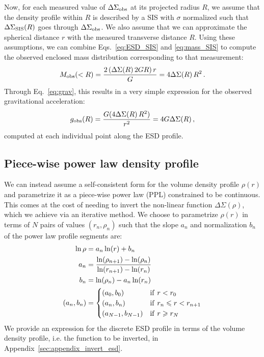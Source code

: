 \documentclass[usenatbib]{mnras}
\newcommand{\un}[1]{_{\rm #1}}
\begin{document}
Now, for each measured value of $\Delta\Sigma\un{obs}$ at its projected radius $R$, we assume that the density profile within $R$ is described by a SIS with $\sigma$ normalized such that $\Delta\Sigma\un{SIS}(R)$ goes through $\Delta\Sigma\un{obs}$. We also assume that we can approximate the spherical distance $r$ with the measured transverse distance $R$. Using these assumptions, we can combine Eqs.~\ref{eq:ESD_SIS} and \ref{eq:mass_SIS} to compute the observed enclosed mass distribution corresponding to that measurement:
\begin{equation}\label{eq:Mobs}
	M\un{obs}(<R) = \frac{2 \, (\Delta\Sigma(R) \, 2 G R) \, r}{G} = 4 \Delta\Sigma(R) \, R^2 \, .
\end{equation}
Through Eq.~\ref{eq:grav}, this results in a very simple expression for the observed gravitational acceleration:
\begin{equation}
g\un{obs}(R) = \frac{G (4 \Delta\Sigma(R) \, R^2)}{r^2} = 4 G \Delta\Sigma(R) \, ,
\end{equation}
computed at each individual point along the ESD profile.

\subsection{Piece-wise power law density profile}
\label{sec:piece-wise_powerlaw}

We can instead assume a self-consistent form for the volume density profile $\rho(r)$ and parametrize it as a piece-wise power law (PPL) constrained to be continuous. This comes at the cost of needing to invert the non-linear function $\Delta\Sigma(\rho)$, which we achieve via an iterative method. We choose to parametrize $\rho(r)$ in terms of $N$ pairs of values $(r_n,\rho_n)$ such that the slope $a_n$ and normalization $b_n$ of the power law profile segments are:
\begin{align}
	\ln\rho &= a_n \ln(r) + b_n \\
	a_n &= \frac{\ln(\rho_{n+1})-\ln(\rho_n)}{\ln(r_{n+1})-\ln(r_n)}\\
	b_n &= \ln(\rho_n) - a_n\ln(r_n)\\
	(a_n, b_n) &=
	\begin{cases}
		(a_0, b_0) & {\rm if}\ r < r_0\\
		(a_n, b_n) & {\rm if}\ r_n \leq r < r_{n+1}\\
		(a_{N-1}, b_{N-1}) & {\rm if}\ r \geq r_N
	\end{cases}
	\label{eq:rho_piecewise_powerlaw}\end{align}
We provide an expression for the discrete ESD profile in terms of the volume density profile, i.e. the function to be inverted, in Appendix~\ref{sec:appendix_invert_esd}.
\end{document}
